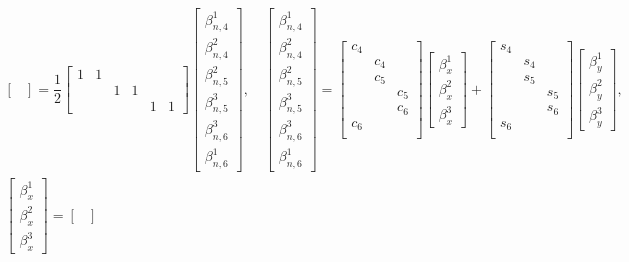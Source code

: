 \documentclass[a4paper,10pt,fleqn]{article}
\begin{document}
\begin{gather}
\begin{bmatrix}
\end{bmatrix}=\dfrac{1}{2}\begin{bmatrix}
1&1&&&&\\
&&1&1&&\\
&&&&1&1
\end{bmatrix}\begin{bmatrix}
\beta_{n,4}^1\\\beta_{n,4}^2\\\beta_{n,5}^2\\\beta_{n,5}^3\\\beta_{n,6}^3\\\beta_{n,6}^1
\end{bmatrix},\quad
\begin{bmatrix}
\beta_{n,4}^1\\\beta_{n,4}^2\\\beta_{n,5}^2\\\beta_{n,5}^3\\\beta_{n,6}^3\\\beta_{n,6}^1
\end{bmatrix}=\begin{bmatrix}
c_4&&\\
&c_4&\\
&c_5&\\
&&c_5\\
&&c_6\\
c_6&&\\
\end{bmatrix}\begin{bmatrix}
\beta_x^1\\\beta_x^2\\\beta_x^3
\end{bmatrix}+\begin{bmatrix}
s_4&&\\
&s_4&\\
&s_5&\\
&&s_5\\
&&s_6\\
s_6&&\\
\end{bmatrix}\begin{bmatrix}
\beta_y^1\\\beta_y^2\\\beta_y^3
\end{bmatrix},\\
\begin{bmatrix}
\beta_x^1\\\beta_x^2\\\beta_x^3
\end{bmatrix}=\begin{bmatrix}

\end{bmatrix}
\end{gather}
\end{document}

